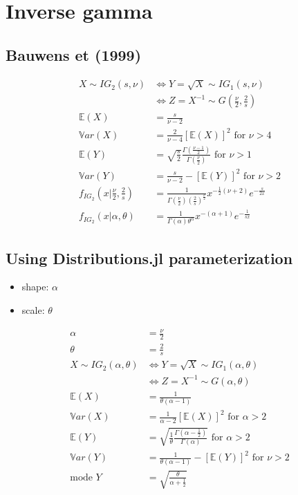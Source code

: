 \documentclass{article}
\begin{document}
\section{Inverse gamma}


\subsection{Bauwens et (1999)}

\begin{align*}
X \sim IG_2(s, \nu) &\Leftrightarrow Y = \sqrt{X} \sim IG_1(s, \nu)\\
& \Leftrightarrow Z = X^{-1} \sim G(\frac{\nu}{2}, \frac{2}{s})\\
\mathbb{E}(X) &= \frac{s}{\nu - 2}\\
\mathbb{V}ar(X) &= \frac{2}{\nu - 4}[\mathbb{E}(X)]^2 \mbox{ for }\nu > 4\\
\mathbb{E}(Y) &= \sqrt{\frac{s}{2}}\frac{\Gamma\left(\frac{\nu
-1}{2}\right)}{\Gamma\left(\frac{\nu}{2}\right)} \mbox{ for }\nu > 1 \\
\mathbb{V}ar(Y) &= \frac{s}{\nu - 2} - [\mathbb{E}(Y)]^2 \mbox{ for }\nu > 2\\
f_{IG_2}(x|\frac{\nu}{2}, \frac{2}{s}) &= \frac{1}{\Gamma(\frac{\nu}{2})\left(\frac{2}{s}\right)^{\frac{\nu}{2}}}x^{-\frac{1}{2}(\nu+2)}e^{-\frac{s}{2x}}    \\
f_{IG_2}(x|\alpha,\theta) &=
                                  \frac{1}{\Gamma(\alpha)\theta^\alpha}
                                  x^{-(\alpha+1)}e^{-\frac{1}{sx}}    
\end{align*}

\subsection{Using Distributions.jl parameterization}

\begin{itemize}
\item shape: $\alpha$
\item scale: $\theta$
\end{itemize}
\begin{align*}
\alpha &= \frac{\nu}{2}\\
\theta &= \frac{2}{s}\\
X \sim IG_2(\alpha, \theta) &\Leftrightarrow Y = \sqrt{X} \sim IG_1(\alpha, \theta)\\
& \Leftrightarrow Z = X^{-1} \sim G(\alpha, \theta)\\
\mathbb{E}(X) &= \frac{1}{\theta(\alpha - 1)}\\
\mathbb{V}ar(X) &= \frac{1}{\alpha - 2}[\mathbb{E}(X)]^2 \mbox{ for }\alpha > 2\\
\mathbb{E}(Y) &= \sqrt{\frac{1}{\theta}\frac{\Gamma(\alpha-\frac{1}{2})}{\Gamma(\alpha)}} \mbox{ for }\alpha > 2 \\
\mathbb{V}ar(Y) &= \frac{1}{\theta(\alpha - 1)} - [\mathbb{E}(Y)]^2 \mbox{ for }\nu > 2\\
\mbox{mode }Y &= \sqrt{\frac{\theta}{\alpha + \frac{1}{2}}}
\end{align*}
\end{document}
